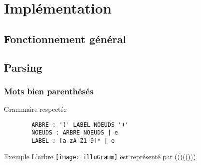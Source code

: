 \section{Implémentation}

\subsection{Fonctionnement général}
%

\subsection{Parsing}

\begin{frame}[fragile]
    \frametitle{Mots bien parenthésés}
    \begin{block}{Grammaire respectée}
    \begin{verbatim}
        ARBRE : '(' LABEL NOEUDS ')'
        NOEUDS : ARBRE NOEUDS | e
        LABEL : [a-zA-Z1-9]* | e
    \end{verbatim}
    \end{block}
    \begin{exampleblock}{Exemple}
    L'arbre \texttt{[image: illuGramm]} est représenté par (()(())).
    \end{exampleblock}
\end{frame}


